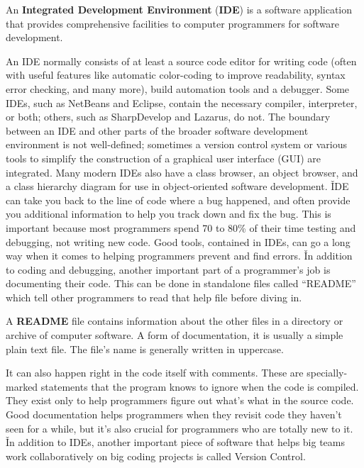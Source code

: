 An \textbf{Integrated Development Environment} (\textbf{IDE}) is a software application that provides comprehensive
facilities to computer programmers for software development.
\ed

An IDE normally consists of at least a source code editor for writing code (often with useful features like automatic
color-coding to improve readability, syntax error checking, and many more), build automation tools and a debugger.
Some IDEs, such as NetBeans and Eclipse, contain the necessary compiler, interpreter, or both; others, such as
SharpDevelop and Lazarus, do not. The boundary between an IDE and other parts of the broader software development
environment is not well-defined; sometimes a version control system or various tools to simplify the construction of
a graphical user interface (GUI) are integrated. Many modern IDEs also have a class browser, an object browser, and a
class hierarchy diagram for use in object-oriented software development. \v

IDE can take you back to the line of code where a bug happened, and often provide you additional information to help
you track down and fix the bug. This is important because most programmers spend 70 to 80\% of their time testing and
debugging, not writing new code. Good tools, contained in IDEs, can go a long way when it comes to helping
programmers prevent and find errors. \v

In addition to coding and debugging, another important part of a programmer's job is documenting their code. This can
be done in standalone files called ``README'' which tell other programmers to read that help file before diving in.

\bd[README]
A \textbf{README} file contains information about the other files in a directory or archive of computer software. A
form of documentation, it is usually a simple plain text file. The file's name is generally written in uppercase.
\ed

It can also happen right in the code itself with comments. These are specially-marked statements that the program
knows to ignore when the code is compiled. They exist only to help programmers figure out what's what in the source
code. Good documentation helps programmers when they revisit code they haven't seen for a while, but it's also crucial
for programmers who are totally new to it. \v

In addition to IDEs, another important piece of software that helps big teams work collaboratively on big coding
projects is called Version Control.

